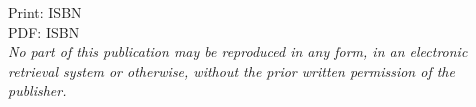 {\begin{titlepage}
{		\noindent Print: ISBN~\ManualTitlePagePrintISBN\\
		PDF: ISBN~\ManualTitlePagePDFISBN\\

		{\noindent\it No part of this publication may be reproduced in any form, in an electronic retrieval system
		or otherwise, without the prior written permission of the publisher.}

		}


	\end{titlepage}
}




